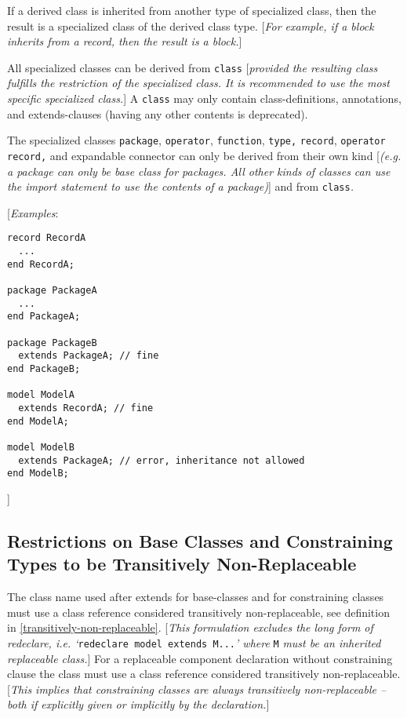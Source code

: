 If a derived class is inherited from another type of specialized class,
then the result is a specialized class of the derived class type.
{[}\emph{For example, if a block inherits from a record, then the result
is a block.}{]}

All specialized classes can be derived from \lstinline[basicstyle=\ttfamily]!class! {[}\emph{provided the
resulting class fulfills the restriction of the specialized class. It is
recommended to use the most specific specialized class.}{]} A \lstinline[basicstyle=\ttfamily]!class! may
only contain class-definitions, annotations, and extends-clauses (having
any other contents is deprecated).

The specialized classes \lstinline[basicstyle=\ttfamily]!package!, \lstinline[basicstyle=\ttfamily]!operator!, \lstinline[basicstyle=\ttfamily]!function!,
\lstinline[basicstyle=\ttfamily]!type,! \lstinline[basicstyle=\ttfamily]!record!,
\lstinline[basicstyle=\ttfamily]!operator record,! and expandable connector can only be derived from their
own kind {[}\emph{(e.g. a package can only be base class for packages.
All other kinds of classes can use the import statement to use the
contents of a package)}{]} and from \lstinline[basicstyle=\ttfamily]!class!\emph{.}

{[}\emph{Examples}:
\begin{lstlisting}[language=modelica]
record RecordA
  ...
end RecordA;

package PackageA
  ...
end PackageA;

package PackageB
  extends PackageA; // fine
end PackageB;

model ModelA
  extends RecordA; // fine
end ModelA;

model ModelB
  extends PackageA; // error, inheritance not allowed
end ModelB;
\end{lstlisting}
{]}

\subsection{Restrictions on Base Classes and Constraining Types to be Transitively Non-Replaceable}

The class name used after extends for base-classes and for constraining
classes must use a class reference considered transitively
non-replaceable, see definition in \autoref{transitively-non-replaceable}. {[}\emph{This
formulation excludes the long form of redeclare, i.e. `}\lstinline[basicstyle=\ttfamily]!redeclare model extends M...!\emph{' where} \lstinline[basicstyle=\ttfamily]!M! \emph{must be an inherited replaceable
class.}{]} For a replaceable component declaration without constraining
clause the class must use a class reference considered transitively
non-replaceable. {[}\emph{This implies that constraining classes are
always transitively non-replaceable -- both if explicitly given or
implicitly by the declaration.}{]}

